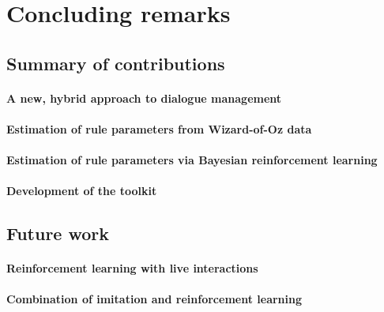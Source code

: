 \chapter{Concluding remarks}
\label{chap:conclusions}

\section{Summary of contributions}

\subsubsection*{A new, hybrid approach to dialogue management}


\subsubsection*{Estimation of rule parameters from Wizard-of-Oz data}

\subsubsection*{Estimation of rule parameters via Bayesian reinforcement learning}

\subsubsection*{Development of the \opendial toolkit}

\section{Future work}


\subsubsection*{Reinforcement learning with live interactions}


\subsubsection*{Combination of imitation and reinforcement learning}

